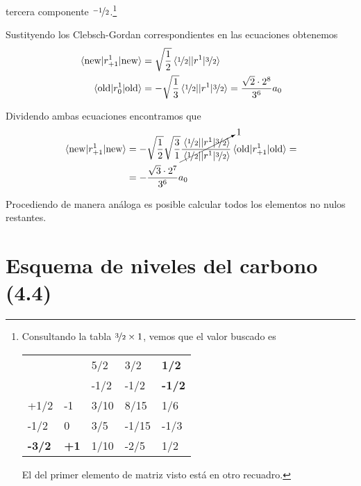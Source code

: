       tercera componente $\nicefrac{-1}{2}$.\footnote{Consultando la tabla
        $\nicefrac{3}{2}\times 1$, vemos
        que el valor buscado es
        \begin{center}
          \begin{tabular}{ll|l|l|l|}
            \cline{3-5}
            &             & 5/2  & 3/2   & \textbf{1/2}  \\ \cline{3-5} 
            &             & -1/2 & -1/2  & \textbf{-1/2} \\ \hline
            \multicolumn{1}{|l|}{+1/2}          & -1          & 3/10 & 8/15  & 1/6           \\ \hline
            \multicolumn{1}{|l|}{-1/2}          & 0           & 3/5  & -1/15 & -1/3          \\ \hline
            \multicolumn{1}{|l|}{\textbf{-3/2}} & \textbf{+1} & 1/10 & -2/5  & \textcolor{red!60!black}{1/2}           \\ \hline
          \end{tabular}
        \end{center}
        El del primer elemento de matriz visto está en otro recuadro.
      }

Sustityendo los Clebsch-Gordan correspondientes en las ecuaciones
obtenemos
\begin{align}
\mel{\text{new}}{r_{+1}^1}{\text{new}} &= \sqrt{\frac{1}{2}}
                                         \mel{ {\nicefrac{1}{2}} }{|r^{1}}{\nicefrac{3}{2}} \\
\mel{\text{old}}{r_{0}^1}{\text{old}} &= -\sqrt{\frac{1}{3}}
                                         \mel{ {\nicefrac{1}{2}} }{|r^{1}}{\nicefrac{3}{2}}
                                        = \frac{\sqrt{2}\cdot2^8}{3^6}a_0
\end{align}

Dividendo ambas ecuaciones encontramos que
\begin{equation}
  \begin{split}
    \mel{\text{new}}{r_{+1}^1}{\text{new}} &=
    -\sqrt{\frac{1}{2}}\sqrt{\frac{3}{1}}\cancelto{1}{\frac{\mel{ {\nicefrac{1}{2}} }{|r^{1}}{\nicefrac{3}{2}}}{\mel{ {\nicefrac{1}{2}} }{|r^{1}}{\nicefrac{3}{2}}}}
    \mel{\text{old}}{r_{+1}^1}{\text{old}} = \\
    &= - \frac{\sqrt{3}\cdot 2^7}{3^6} a_0 
  \end{split}
\end{equation}

Procediendo de manera análoga es posible calcular todos los elementos
no nulos restantes.

\chapter{Esquema de niveles del carbono (4.4)}


